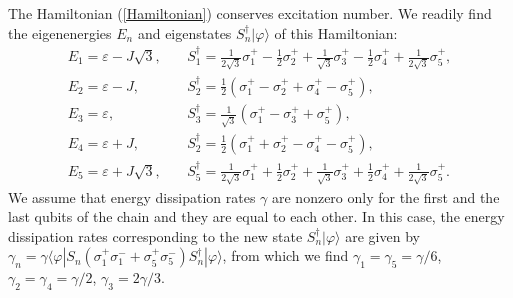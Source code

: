 \documentclass[%
 aps, pra,
 amsmath,amssymb,
 preprint,%
superscriptaddress
]{revtex4-2}
\begin{document}
The Hamiltonian (\ref{Hamiltonian}) conserves excitation number. We readily find the eigenenergies $E_n$ and eigenstates $S_n^{\dagger} |\varphi\rangle$ of this Hamiltonian:
\begin{eqnarray}
E_1 = \varepsilon - J \sqrt{3}, &&\ 
S_1^{\dagger}=\frac{1}{2\sqrt{3}}\sigma_1^{+} - \frac{1}{2}\sigma_2^{+} + \frac{1}{\sqrt{3}}\sigma_3^{+} - \frac{1}{2}\sigma_4^{+} + \frac{1}{2\sqrt{3}}\sigma_5^{+},
\\ \nonumber
E_2 = \varepsilon - J , &&\ 
S_2^{\dagger}=\frac{1}{2}\left(\sigma_1^{+} - \sigma_2^{+} + \sigma_4^{+} - \sigma_5^{+}\right),
\\ \nonumber
E_3 = \varepsilon, &&\ 
S_3^{\dagger}=\frac{1}{\sqrt{3}}\left(\sigma_1^{+} - \sigma_3^{+} + \sigma_5^{+}\right),
\\ \nonumber
E_4 = \varepsilon + J , &&\ 
S_2^{\dagger}=\frac{1}{2}\left(\sigma_1^{+} + \sigma_2^{+} - \sigma_4^{+} - \sigma_5^{+}\right),
\\ \nonumber
E_5 = \varepsilon + J \sqrt{3}, &&\ 
S_5^{\dagger}=\frac{1}{2\sqrt{3}}\sigma_1^{+} + \frac{1}{2}\sigma_2^{+} + \frac{1}{\sqrt{3}}\sigma_3^{+} + \frac{1}{2}\sigma_4^{+} + \frac{1}{2\sqrt{3}}\sigma_5^{+}.
\label{E}
\end{eqnarray}
We assume that energy dissipation rates $\gamma$ are nonzero only for the first and the last qubits of the chain and they are equal to each other. In this case, the energy dissipation rates corresponding to the new state $S_n^{\dagger} |\varphi\rangle$ are given by $\gamma_n=\gamma \langle \varphi |S_n (\sigma_1^{+} \sigma_1^{-} +  \sigma_5^{+} \sigma_5^{-} )S_n^{\dagger} |\varphi\rangle$, from which we find $\gamma_1=\gamma_5 = \gamma /6$, $\gamma_2=\gamma_4= \gamma/2$, $\gamma_3= 2\gamma /3$.
\end{document}
